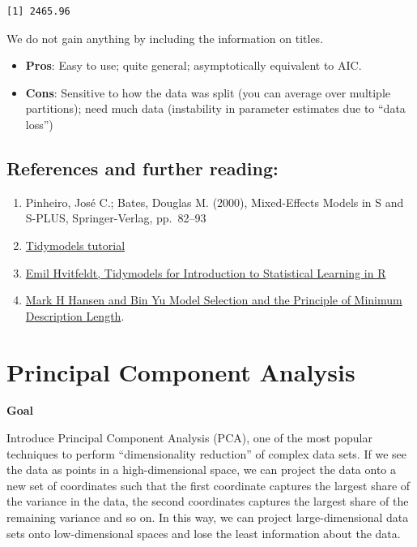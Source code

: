 \documentclass[
  letterpaper,
  DIV=11,
  numbers=noendperiod]{scrreprt}
\providecommand{\tightlist}{%
  \setlength{\itemsep}{0pt}\setlength{\parskip}{0pt}}\usepackage{longtable,booktabs,array}
\begin{document}
\begin{verbatim}
[1] 2465.96
\end{verbatim}

We do not gain anything by including the information on titles.

\begin{itemize}
\tightlist
\item
  \textbf{Pros}: Easy to use; quite general; asymptotically equivalent
  to AIC.
\item
  \textbf{Cons}: Sensitive to how the data was split (you can average
  over multiple partitions); need much data (instability in parameter
  estimates due to ``data loss'')
\end{itemize}

\hypertarget{references-and-further-reading}{%
\section{References and further
reading:}\label{references-and-further-reading}}

\begin{enumerate}
\def\labelenumi{\arabic{enumi}.}
\item
  Pinheiro, José C.; Bates, Douglas M. (2000), Mixed-Effects Models in S
  and S-PLUS, Springer-Verlag, pp.~82--93
\item
  \href{https://www.tidymodels.org/start/}{Tidymodels tutorial}
\item
  \href{https://emilhvitfeldt.github.io/ISLR-tidymodels-labs/index.html}{Emil
  Hvitfeldt, Tidymodels for Introduction to Statistical Learning in R}
\item
  \href{https://www.tandfonline.com/doi/abs/10.1198/016214501753168398}{Mark
  H Hansen and Bin Yu Model Selection and the Principle of Minimum
  Description Length}.
\end{enumerate}


\hypertarget{principal-component-analysis}{%
\chapter{Principal Component
Analysis}\label{principal-component-analysis}}

\textbf{Goal}

Introduce Principal Component Analysis (PCA), one of the most popular
techniques to perform ``dimensionality reduction'' of complex data sets.
If we see the data as points in a high-dimensional space, we can project
the data onto a new set of coordinates such that the first coordinate
captures the largest share of the variance in the data, the second
coordinates captures the largest share of the remaining variance and so
on. In this way, we can project large-dimensional data sets onto
low-dimensional spaces and lose the least information about the data.
\end{document}

